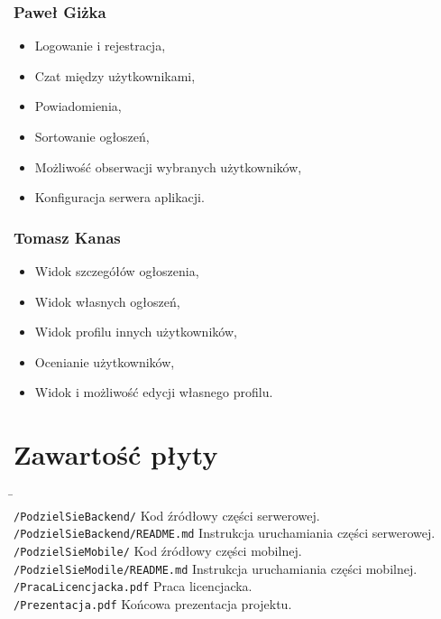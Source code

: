 \documentclass[licencjacka]{pracamgr}
\begin{document}
\subsection{Paweł Giżka}
\begin{itemize}
\setlength\itemsep{-0.2em}
    \item Logowanie i rejestracja,
    \item Czat między użytkownikami,
    \item Powiadomienia,
    \item Sortowanie ogłoszeń,
    \item Możliwość obserwacji wybranych użytkowników,
    \item Konfiguracja serwera aplikacji.
\end{itemize}{}

\subsection{Tomasz Kanas}
\begin{itemize}
\setlength\itemsep{-0.2em}
    \item Widok szczegółów ogłoszenia,
    \item Widok własnych ogłoszeń,
    \item Widok profilu innych użytkowników,
    \item Ocenianie użytkowników,
    \item Widok i możliwość edycji własnego profilu.
\end{itemize}{}

\chapter{Zawartość płyty}\label{r:build}
\begin{tabbing}
      \hspace{20em} \=   \hspace{10em} \\
    \texttt{/PodzielSieBackend/} \> Kod źródłowy części serwerowej. \\
    \texttt{/PodzielSieBackend/README.md} \> Instrukcja uruchamiania części serwerowej. \\
    \texttt{/PodzielSieMobile/} \> Kod źródłowy części mobilnej. \\
    \texttt{/PodzielSieModile/README.md} \> Instrukcja uruchamiania części mobilnej. \\
    \texttt{/PracaLicencjacka.pdf} \> Praca licencjacka. \\
    \texttt{/Prezentacja.pdf} \> Końcowa prezentacja projektu. \\
\end{tabbing}
\end{document}
